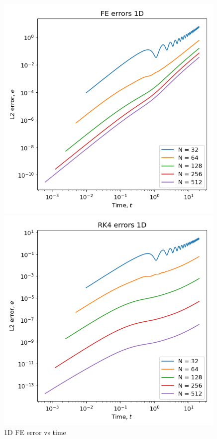 \documentclass[12pt]{article}
\begin{document}
\begin{figure}
    \centering
    \begin{minipage}{0.3\textwidth}
        \centering
        \includegraphics[width=0.99\textwidth]{../figures/FE_errors_1D.png}
        \caption{1D FE error vs time}
        \label{fig:1d_fe_err}
    \end{minipage}\hfill
    \begin{minipage}{0.3\textwidth}
        \centering
        \includegraphics[width=0.99\textwidth]{../figures/RK4_errors_1D.png}

\end{minipage}
\end{figure}
\end{document}
